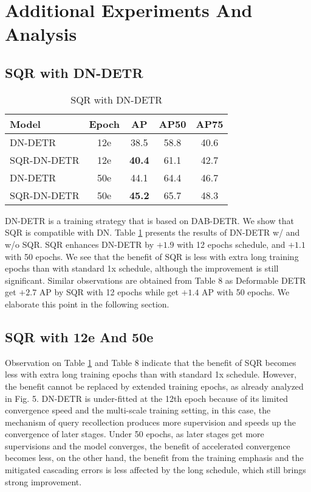 \documentclass[10pt,twocolumn,letterpaper]{article}
\begin{document}
\section{Additional Experiments And Analysis}

\subsection{SQR with DN-DETR}
\begin{table}[h]
\centering
    \begin{tabular}{l|c|c|c|c}
    \toprule[1pt]
        Model &  Epoch &  AP & AP50 & AP75 \\ 
        \midrule
        DN-DETR \cite{Li2022DNDETRAD}        & 12e & 38.5 & 58.8 & 40.6 \\ 
        SQR-DN-DETR    & 12e & \textbf{40.4} & 61.1 & 42.7 \\
        \midrule
        DN-DETR \cite{Li2022DNDETRAD}        & 50e & 44.1 & 64.4 & 46.7 \\ 
        SQR-DN-DETR    & 50e & \textbf{45.2} & 65.7 & 48.3 \\
       \bottomrule
    \end{tabular}
    \caption{SQR with DN-DETR}
    \label{tab:SQR-DN-DETR}
\end{table}

DN-DETR \cite{Li2022DNDETRAD} is a training strategy that is based on DAB-DETR. We show that SQR is compatible with DN. Table \ref{tab:SQR-DN-DETR} presents the results of DN-DETR w/ and w/o SQR. SQR enhances DN-DETR by $+1.9$ with 12 epochs schedule, and $+1.1$ with 50 epochs. We see that the benefit of SQR is less with extra long training epochs than with standard 1x schedule, although the improvement is still significant. Similar observations are obtained from Table {\color{red} 8} as Deformable DETR get $+2.7$ AP by SQR with 12 epochs while get $+1.4$ AP with 50 epochs. We elaborate this point in the following section.

\subsection{SQR with 12e And 50e}

Observation on Table \ref{tab:SQR-DN-DETR} and Table {\color{red} 8} indicate that the benefit of SQR becomes less with extra long training epochs than with standard 1x schedule. However, the benefit cannot be replaced by extended training epochs, as already analyzed in Fig.{\color{red} 5}. DN-DETR is under-fitted at the 12th epoch because of its limited convergence speed and the multi-scale training setting, in this case, the mechanism of query recollection produces more supervision and speeds up the convergence of later stages. Under 50 epochs, as later stages get more supervisions and the model converges, the benefit of accelerated convergence becomes less, on the other hand, the benefit from the training emphasis and the mitigated cascading errors is less affected by the long schedule, which still brings strong improvement. 
\end{document}
